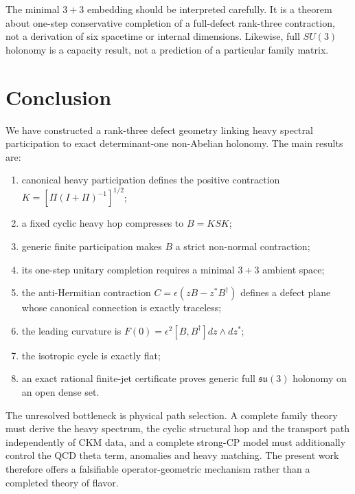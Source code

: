 \documentclass[11pt]{article}
\theoremstyle{remark}\newtheorem{remark}{Remark}
\begin{document}
The minimal $3+3$ embedding should be interpreted carefully. It is a theorem about one-step conservative completion of a full-defect rank-three contraction, not a derivation of six spacetime or internal dimensions. Likewise, full $SU(3)$ holonomy is a capacity result, not a prediction of a particular family matrix.

\section{Conclusion}
We have constructed a rank-three defect geometry linking heavy spectral participation to exact determinant-one non-Abelian holonomy. The main results are:
\begin{enumerate}[leftmargin=*]
\item canonical heavy participation defines the positive contraction $K=[\Pi(I+\Pi)^{-1}]^{1/2}$;
\item a fixed cyclic heavy hop compresses to $B=KSK$;
\item generic finite participation makes $B$ a strict non-normal contraction;
\item its one-step unitary completion requires a minimal $3+3$ ambient space;
\item the anti-Hermitian contraction $C=\epsilon(zB-z^*B^\dagger)$ defines a defect plane whose canonical connection is exactly traceless;
\item the leading curvature is $F(0)=\epsilon^2[B,B^\dagger]dz\wedge dz^*$;
\item the isotropic cycle is exactly flat;
\item an exact rational finite-jet certificate proves generic full $\mathfrak{su}(3)$ holonomy on an open dense set.
\end{enumerate}
The unresolved bottleneck is physical path selection. A complete family theory must derive the heavy spectrum, the cyclic structural hop and the transport path independently of CKM data, and a complete strong-CP model must additionally control the QCD theta term, anomalies and heavy matching. The present work therefore offers a falsifiable operator-geometric mechanism rather than a completed theory of flavor.

\appendix
\end{document}
